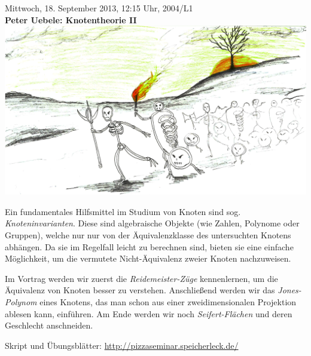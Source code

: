 \documentclass[a4paper,ngerman,landscape]{scrartcl}
\begin{document}
\begin{center}
  \huge
  Mittwoch, 18. September 2013, 12:15 Uhr, 2004/L1 \\
  \textbf{Peter Uebele: Knotentheorie II}
  \vfill
  \includegraphics[scale=0.6]{knotenarmee-duester-farbkorrigiert}
  \vfill

  \Large
  \begin{minipage}{0.94\textwidth}
    \setlength\parskip{\medskipamount}
    Ein fundamentales Hilfsmittel im Studium von Knoten sind sog.
    \emph{Knoteninvarianten}. Diese sind algebraische Objekte (wie Zahlen,
    Polynome oder Gruppen), welche nur nur von der Äquivalenzklasse des
    untersuchten Knotens abhängen. Da sie im Regelfall leicht zu berechnen sind,
    bieten sie eine einfache Möglichkeit, um die vermutete Nicht-Äquivalenz
    zweier Knoten nachzuweisen.

    Im Vortrag werden wir zuerst die \emph{Reidemeister-Züge} kennenlernen, um
    die Äquivalenz von Knoten besser zu verstehen. Anschließend werden wir das
    \emph{Jones-Polynom} eines Knotens, das man schon aus einer
    zweidimensionalen Projektion ablesen kann, einführen. Am Ende
    werden wir noch \emph{Seifert-Flächen} und deren Geschlecht anschneiden.
  \end{minipage}
\end{center}

\hfill\small Skript und Übungsblätter: \url{http://pizzaseminar.speicherleck.de/}
\end{document}
